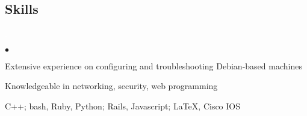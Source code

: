 \documentclass[margin,line]{res}
\newenvironment{list2}
  {\vspace{-4mm}
   \begin{list}{$\bullet$}{
     \setlength{\itemsep}{0in}
     \setlength{\parsep}{0in} \setlength{\parskip}{0in}
     \setlength{\topsep}{0in} \setlength{\partopsep}{0in}
     \setlength{\leftmargin}{0.18in}}}
  {\end{list}}
\begin{document}
\begin{resume}
%
%
\section{\sc Skills} 
\textcolor{white}{.}
\begin{list2}
\item Extensive experience on configuring and troubleshooting Debian-based machines
\item Knowledgeable in networking, security, web programming
\item C++; bash, Ruby, Python; Rails, Javascript; \LaTeX, Cisco IOS
\end{list2}


%
%



%
%


\end{resume}
\end{document}
